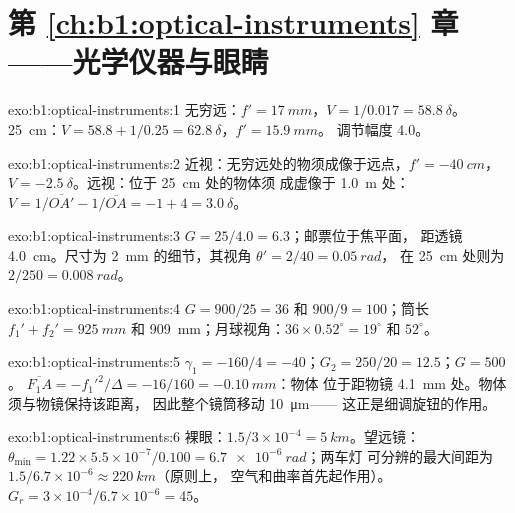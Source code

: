 \section*{第 \ref{ch:b1:optical-instruments} 章——光学仪器与眼睛}

\begin{solution}{exo:b1:optical-instruments:1}
无穷远：$f' = \qty{17}{mm}$，$V = 1/0.017 = \qty{58.8}{\delta}$。
\qty{25}{cm}：$V = 58.8 + 1/0.25 = \qty{62.8}{\delta}$，$f' = \qty{15.9}{mm}$。
调节幅度 \qty{4.0}{\delta}。
\end{solution}

\begin{solution}{exo:b1:optical-instruments:2}
近视：无穷远处的物须成像于远点，$f' = \qty{-40}{cm}$，
$V = \qty{-2.5}{\delta}$。远视：位于 \qty{25}{cm} 处的物体须
成虚像于 \qty{1.0}{m} 处：$V = 1/\overline{OA'} - 1/\overline{OA}
= -1 + 4 = \qty{+3.0}{\delta}$。
\end{solution}

\begin{solution}{exo:b1:optical-instruments:3}
$G = 25/4.0 = 6.3$；邮票位于焦平面，
距透镜 \qty{4.0}{cm}。尺寸为 \qty{2}{mm} 的细节，其视角 $\theta' = 2/40 = \qty{0.05}{rad}$，
在 \qty{25}{cm} 处则为 $2/250 = \qty{0.008}{rad}$。
\end{solution}

\begin{solution}{exo:b1:optical-instruments:4}
$G = 900/25 = 36$ 和 $900/9 = 100$；筒长 $f_1' + f_2' =
\qty{925}{mm}$ 和 \qty{909}{mm}；月球视角：$36 \times 0.52^\circ = 19^\circ$ 和
$52^\circ$。
\end{solution}

\begin{solution}{exo:b1:optical-instruments:5}
$\gamma_1 = -160/4 = -40$；$G_2 = 250/20 = 12.5$；$G = 500$。
$\overline{F_1A} = -f_1'^2/\Delta = -16/160 = \qty{-0.10}{mm}$：物体
位于距物镜 \qty{4.1}{mm} 处。物体须与物镜保持该距离，
因此整个镜筒移动 \qty{10}{\micro m}——
这正是细调旋钮的作用。
\end{solution}

\begin{solution}{exo:b1:optical-instruments:6}
裸眼：$1.5/3\times10^{-4} = \qty{5}{km}$。望远镜：$\theta_{\min}
= 1.22 \times 5.5\times10^{-7}/0.100 = \qty{6.7e-6}{rad}$；两车灯
可分辨的最大间距为 $1.5/6.7\times10^{-6} \approx \qty{220}{km}$（原则上，
空气和曲率首先起作用）。$G_r = 3\times10^{-4}/
6.7\times10^{-6} = 45$。
\end{solution}

